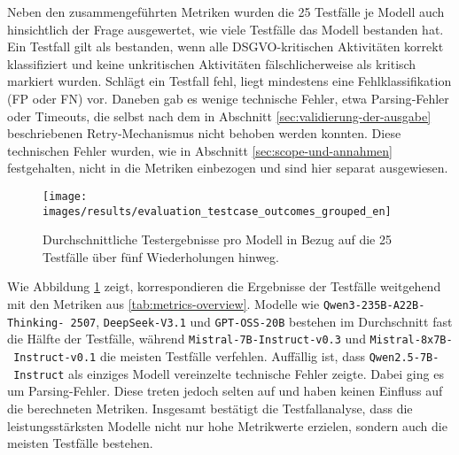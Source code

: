 Neben den zusammengeführten Metriken wurden die 25 Testfälle je Modell auch hinsichtlich der Frage ausgewertet, wie viele Testfälle das Modell bestanden hat. Ein Testfall gilt als bestanden, wenn alle \ac{DSGVO}-kritischen Aktivitäten korrekt klassifiziert und keine unkritischen Aktivitäten fälschlicherweise als kritisch markiert wurden. Schlägt ein Testfall fehl, liegt mindestens eine Fehlklassifikation (\ac{FP} oder \ac{FN}) vor. Daneben gab es wenige technische Fehler, etwa Parsing‑Fehler oder Timeouts, die selbst nach dem in Abschnitt  \ref{sec:validierung-der-ausgabe} beschriebenen Retry‑Mechanismus nicht behoben werden konnten. Diese technischen Fehler wurden, wie in Abschnitt \ref{sec:scope-und-annahmen} festgehalten, nicht in die Metriken einbezogen und sind hier separat ausgewiesen.

\begin{figure}[htbp]
    \centering
    \texttt{[image: images/results/evaluation\_testcase\_outcomes\_grouped\_en]}
    \caption{Durchschnittliche Testergebnisse pro Modell in Bezug auf die 25 Testfälle über fünf Wiederholungen hinweg.}
    \label{fig:results-testcase-outcomes}
\end{figure}

Wie Abbildung \ref{fig:results-testcase-outcomes} zeigt, korrespondieren die Ergebnisse der Testfälle weitgehend mit den Metriken aus \autoref{tab:metrics-overview}. Modelle wie \texttt{Qwen3-235B-A22B-Thinking-\linebreak~2507}, \texttt{DeepSeek-V3.1} und \texttt{GPT-OSS-20B} bestehen im Durchschnitt fast die Hälfte der Testfälle, während \texttt{Mistral-7B-Instruct-v0.3} und \texttt{Mistral-8x7B-\linebreak~Instruct-v0.1} die meisten Testfälle verfehlen. Auffällig ist, dass \texttt{Qwen2.5-7B-\linebreak~Instruct} als einziges Modell vereinzelte technische Fehler zeigte. Dabei ging es um Parsing-Fehler. Diese treten jedoch selten auf und haben keinen Einfluss auf die berechneten Metriken. Insgesamt bestätigt die Testfallanalyse, dass die leistungsstärksten Modelle nicht nur hohe Metrikwerte erzielen, sondern auch die meisten Testfälle bestehen.